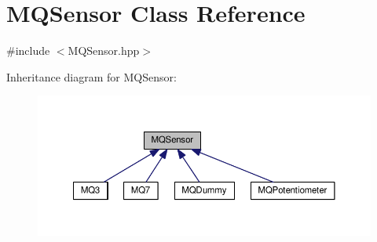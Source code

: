 \hypertarget{class_m_q_sensor}{}\section{M\+Q\+Sensor Class Reference}
\label{class_m_q_sensor}


{\ttfamily \#include $<$M\+Q\+Sensor.\+hpp$>$}



Inheritance diagram for M\+Q\+Sensor\+:\nopagebreak
\begin{figure}[H]
\begin{center}
\leavevmode
\includegraphics[width=350pt]{class_m_q_sensor__inherit__graph}
\end{center}
\end{figure}
